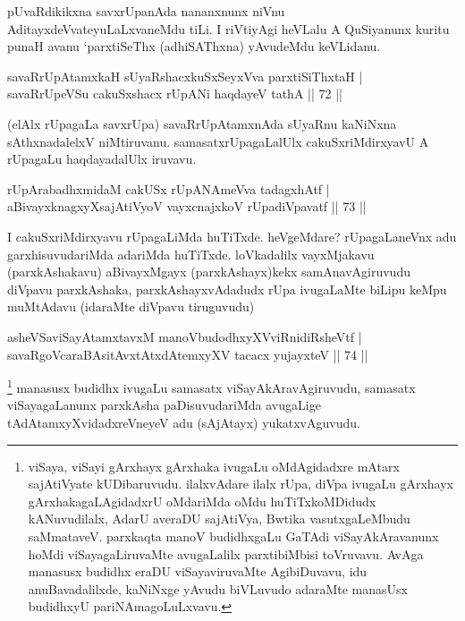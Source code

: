 \begin{artha}
pUvaRdikikxna savxrUpanAda nananxnunx niVnu AditayxdeVvateyuLaLxvaneMdu tiLi. I riVtiyAgi heVLalu A QuSiyanunx kuritu punaH avanu `parxtiSeThx (adhiSAThxna) yAvudeMdu keVLidanu.
\end{artha}

\begin{shl}
savaRrUpAtamxkaH sUyaRshacxkuSxSeyxVva parxtiSiThxtaH |\\
savaRrUpeVSu cakuSxshacx rUpANi haqdayeV tathA \hfill || 72 ||
\end{shl}

\begin{artha}
(elAlx rUpagaLa savxrUpa) savaRrUpAtamxnAda sUyaRnu kaNiNxna sAthxnadalelxV niMtiruvanu. samasatxrUpagaLalUlx cakuSxriMdirxyavU A rUpagaLu haqdayadalUlx iruvavu.
\end{artha}

\begin{shl}
rUpArabadhxmidaM cakUSx rUpANAmeVva tadagxhAtf |\\
aBivayxknagxyXsajAtiVyoV vayxcnajxkoV \footnotemark[1]{}rUpadiVpavatf \hfill || 73 ||
\end{shl}

\begin{artha}
I cakuSxriMdirxyavu rUpagaLiMda huTiTxde. heVgeMdare? rUpagaLaneVnx adu garxhisuvudariMda adariMda huTiTxde. loVkadalilx vayxMjakavu (parxkAshakavu) aBivayxMgayx (parxkAshayx)kekx samAnavAgiruvudu diVpavu parxkAshaka, parxkAshayxvAdadudx rUpa ivugaLaMte biLipu keMpu muMtAdavu (idaraMte diVpavu tiruguvudu)
\end{artha}


\begin{shl}
asheVSaviSayAtamxtavxM manoVbudodhxyXVviRnidiRsheVtf |\\
savaRgoVcaraBAsitAvxtAtxdAtemxyXV tacacx yujayxteV \hfill || 74 ||
\end{shl}

\begin{artha}
\footnote[1]{viSaya, viSayi gArxhayx gArxhaka ivugaLu oMdAgidadxre mAtarx sajAtiVyate kUDibaruvudu. ilalxvAdare ilalx rUpa, diVpa ivugaLu gArxhayx gArxhakagaLAgidadxrU oMdariMda oMdu huTiTxkoMDidudx kANuvudilalx, AdarU averaDU sajAtiVya, Bwtika vasutxgaLeMbudu saMmataveV. parxkaqta manoV budidhxgaLu GaTAdi viSayAkAravanunx hoMdi viSayagaLiruvaMte avugaLalilx parxtibiMbisi toVruvavu. AvAga manasusx budidhx eraDU viSayaviruvaMte AgibiDuvavu, idu anuBavadalilxde, kaNiNxge yAvudu biVLuvudo adaraMte manasUsx budidhxyU pariNAmagoLuLxvavu.} manasusx budidhx ivugaLu samasatx viSayAkAravAgiruvudu, samasatx viSayagaLanunx parxkAsha paDisuvudariMda avugaLige tAdAtamxyXvidadxreVneyeV adu (sAjAtayx) yukatxvAguvudu.
\end{artha}

